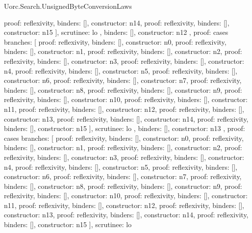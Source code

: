 \begin{lexlean}{Uorc.Search.UnsignedByteConversionLaws}
\begin{semanticmodule}
{{{{            {proof: reflexivity{}, binders: [], constructor: n14},
            {proof: reflexivity{}, binders: [], constructor: n15}
          ],
          scrutinee: lo
        },
        binders: [],
        constructor: n12
      },
      {
        proof: cases{
          branches: [
            {proof: reflexivity{}, binders: [], constructor: n0},
            {proof: reflexivity{}, binders: [], constructor: n1},
            {proof: reflexivity{}, binders: [], constructor: n2},
            {proof: reflexivity{}, binders: [], constructor: n3},
            {proof: reflexivity{}, binders: [], constructor: n4},
            {proof: reflexivity{}, binders: [], constructor: n5},
            {proof: reflexivity{}, binders: [], constructor: n6},
            {proof: reflexivity{}, binders: [], constructor: n7},
            {proof: reflexivity{}, binders: [], constructor: n8},
            {proof: reflexivity{}, binders: [], constructor: n9},
            {proof: reflexivity{}, binders: [], constructor: n10},
            {proof: reflexivity{}, binders: [], constructor: n11},
            {proof: reflexivity{}, binders: [], constructor: n12},
            {proof: reflexivity{}, binders: [], constructor: n13},
            {proof: reflexivity{}, binders: [], constructor: n14},
            {proof: reflexivity{}, binders: [], constructor: n15}
          ],
          scrutinee: lo
        },
        binders: [],
        constructor: n13
      },
      {
        proof: cases{
          branches: [
            {proof: reflexivity{}, binders: [], constructor: n0},
            {proof: reflexivity{}, binders: [], constructor: n1},
            {proof: reflexivity{}, binders: [], constructor: n2},
            {proof: reflexivity{}, binders: [], constructor: n3},
            {proof: reflexivity{}, binders: [], constructor: n4},
            {proof: reflexivity{}, binders: [], constructor: n5},
            {proof: reflexivity{}, binders: [], constructor: n6},
            {proof: reflexivity{}, binders: [], constructor: n7},
            {proof: reflexivity{}, binders: [], constructor: n8},
            {proof: reflexivity{}, binders: [], constructor: n9},
            {proof: reflexivity{}, binders: [], constructor: n10},
            {proof: reflexivity{}, binders: [], constructor: n11},
            {proof: reflexivity{}, binders: [], constructor: n12},
            {proof: reflexivity{}, binders: [], constructor: n13},
            {proof: reflexivity{}, binders: [], constructor: n14},
            {proof: reflexivity{}, binders: [], constructor: n15}
          ],
          scrutinee: lo
}}}}
\end{semanticmodule}
\end{lexlean}
